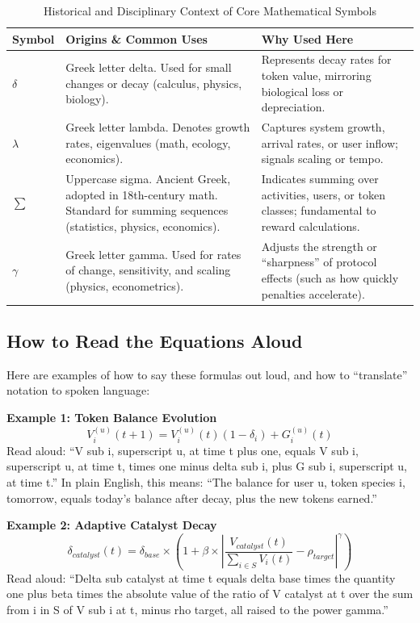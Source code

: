 \documentclass[11pt,letterpaper]{article}
\begin{document}
\begin{table}[H]
\centering
\caption{Historical and Disciplinary Context of Core Mathematical Symbols}
\begin{tabular}{p{1.5cm} p{5cm} p{6cm}}
\toprule
\textbf{Symbol} & \textbf{Origins \& Common Uses} & \textbf{Why Used Here} \\
\midrule
$\delta$ & Greek letter delta. Used for small changes or decay (calculus, physics, biology). & Represents decay rates for token value, mirroring biological loss or depreciation. \\
$\lambda$ & Greek letter lambda. Denotes growth rates, eigenvalues (math, ecology, economics). & Captures system growth, arrival rates, or user inflow; signals scaling or tempo. \\
$\sum$ & Uppercase sigma. Ancient Greek, adopted in 18th-century math. Standard for summing sequences (statistics, physics, economics). & Indicates summing over activities, users, or token classes; fundamental to reward calculations. \\
$\gamma$ & Greek letter gamma. Used for rates of change, sensitivity, and scaling (physics, econometrics). & Adjusts the strength or “sharpness” of protocol effects (such as how quickly penalties accelerate). \\
\bottomrule
\end{tabular}
\end{table}

\subsection*{How to Read the Equations Aloud}

Here are examples of how to say these formulas out loud, and how to “translate” notation to spoken language:

\vspace{0.5em}

\noindent
\textbf{Example 1: Token Balance Evolution}
\[
V_i^{(u)}(t+1) = V_i^{(u)}(t)(1 - \delta_i) + G_i^{(u)}(t)
\]
Read aloud: “V sub i, superscript u, at time t plus one, equals V sub i, superscript u, at time t, times one minus delta sub i, plus G sub i, superscript u, at time t.” In plain English, this means: “The balance for user u, token species i, tomorrow, equals today’s balance after decay, plus the new tokens earned.”

\vspace{0.5em}

\noindent
\textbf{Example 2: Adaptive Catalyst Decay}
\[
\delta_{catalyst}(t) = \delta_{base} \times \left(1 + \beta \times \left| \frac{V_{catalyst}(t)}{\sum_{i \in S} V_i(t)} - \rho_{target} \right|^{\gamma}\right)
\]
Read aloud: “Delta sub catalyst at time t equals delta base times the quantity one plus beta times the absolute value of the ratio of V catalyst at t over the sum from i in S of V sub i at t, minus rho target, all raised to the power gamma.”
\end{document}
